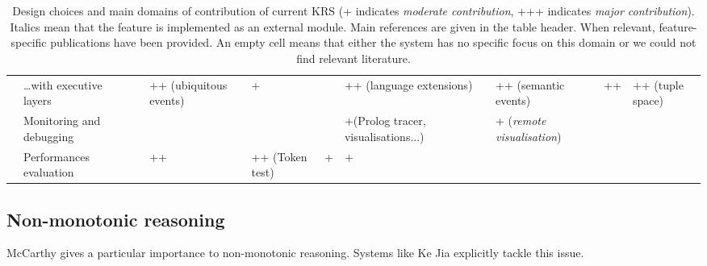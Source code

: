 \documentclass[journal]{IEEEtran}
\begin{document}
\begin{landscape}
\begin{table}
\begin{center}
\begin{tabular}{p{0.2cm}p{3.4cm}p{1.6cm}p{1.3cm}p{1.7cm}p{1.5cm}p{2cm}p{2cm}p{2cm}p{1.4cm}p{1.8cm}}
                                                      & \ldots with executive layers &                           & ++ (ubiquitous events)      & +                           &                             & ++ (language extensions) \cite{Beetz2010} &                                          & ++ (semantic events)                          & ++                            & ++ (tuple space)               \\
                                                          & Monitoring and debugging &                           &                             &                             &                             & +(Prolog tracer, visualisations...)&                                                 & + ({\em remote visualisation})                &                               &                                \\
                                                           & Performances evaluation &                           & ++ \cite{Hawes2008}         & ++ (Token test)             & +                           & + \cite{Tenorth2011}               &                                                 &                                               &                               &                                \\

\bottomrule

\end{tabular}
\end{center}

\caption{Design choices and main domains of contribution of current KRS (+
indicates \emph{moderate contribution}, +++ indicates \emph{major
contribution}). Italics mean that the feature is implemented as an external
module. Main references are given in the table header. When relevant,
feature-specific publications have been provided.  An empty cell means that
either the system has no specific focus on this domain or we could not find
relevant literature.}

\label{table|contribution-by-systems}
\end{table}
\end{landscape}

\subsection{Non-monotonic reasoning}

McCarthy gives a particular importance to non-monotonic reasoning. Systems like
Ke Jia explicitly tackle this issue.
\end{document}
